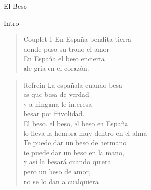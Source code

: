 \begin{song}{El Beso}

\begin{instrumental}{Intro}
 \measure{} \measure{}  \measure{} \measure{} \measure{} \measure{}
 \measure{} \measure{} \measure{} \measure{}  \measure{}  \measure{}    
\end{instrumental}

\begin{verse}{Couplet 1}
En España bendita tierra\\
donde puso su trono el amor\\
En España el beso encierra\\
ale-gria en el corazón.\\
\end{verse}

\begin{verse}{Refrein}
La española cuando besa  \hspace{7.5em}\\ 
es que besa de verdad\\
y a ninguna le interesa\\
besar por frivolidad.\\
El beso,\hspace{5em} el beso, el beso en España\\
lo lleva \hspace{5em} la hembra muy dentro en el alma\\
Te puedo dar un beso de hermano \\
te puede dar un beso en la mano, \\
y así \hspace{2em} la besará cuando quiera\\
pero un beso de amor,\\
no se lo dan a cualquiera \hspace{1.5em}\\
\end{verse}


\end{song}
